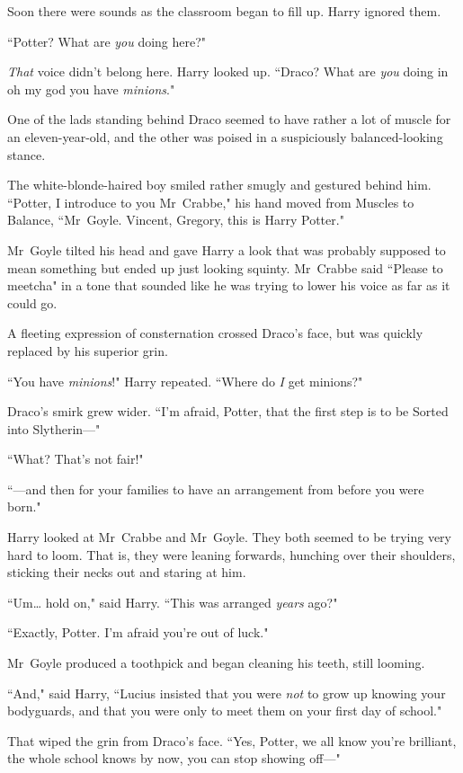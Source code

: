 Soon there were sounds as the classroom began to fill up. Harry ignored them.

``Potter? What are \emph{you} doing here?"

\emph{That} voice didn't belong here. Harry looked up. ``Draco? What are \emph{you} doing in oh my god you have \emph{minions}."

One of the lads standing behind Draco seemed to have rather a lot of muscle for an eleven-year-old, and the other was poised in a suspiciously balanced-looking stance.

The white-blonde-haired boy smiled rather smugly and gestured behind him. ``Potter, I introduce to you Mr~Crabbe," his hand moved from Muscles to Balance, ``Mr~Goyle. Vincent, Gregory, this is Harry Potter."

Mr~Goyle tilted his head and gave Harry a look that was probably supposed to mean something but ended up just looking squinty. Mr~Crabbe said ``Please to meetcha" in a tone that sounded like he was trying to lower his voice as far as it could go.

A fleeting expression of consternation crossed Draco's face, but was quickly replaced by his superior grin.

``You have \emph{minions}!" Harry repeated. ``Where do \emph{I} get minions?"

Draco's smirk grew wider. ``I'm afraid, Potter, that the first step is to be Sorted into Slytherin—"

``What? That's not fair!"

``—and then for your families to have an arrangement from before you were born."

Harry looked at Mr~Crabbe and Mr~Goyle. They both seemed to be trying very hard to loom. That is, they were leaning forwards, hunching over their shoulders, sticking their necks out and staring at him.

``Um{\ldots} hold on," said Harry. ``This was arranged \emph{years} ago?"

``Exactly, Potter. I'm afraid you're out of luck."

Mr~Goyle produced a toothpick and began cleaning his teeth, still looming.

``And," said Harry, ``Lucius insisted that you were \emph{not} to grow up knowing your bodyguards, and that you were only to meet them on your first day of school."

That wiped the grin from Draco's face. ``Yes, Potter, we all know you're brilliant, the whole school knows by now, you can stop showing off—"


